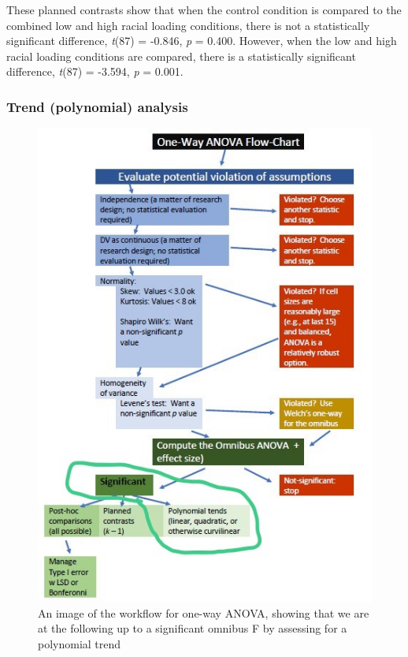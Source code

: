 \documentclass[
  english,
]{book}
\newenvironment{Shaded}{\begin{snugshade}}{\end{snugshade}}
\newcommand{\DecValTok}[1]{\textcolor[rgb]{0.00,0.00,0.81}{#1}}
\newcommand{\FunctionTok}[1]{\textcolor[rgb]{0.00,0.00,0.00}{#1}}
\newcommand{\NormalTok}[1]{#1}
\newcommand{\OtherTok}[1]{\textcolor[rgb]{0.56,0.35,0.01}{#1}}
\newcommand{\SpecialCharTok}[1]{\textcolor[rgb]{0.00,0.00,0.00}{#1}}
\begin{document}
\begin{Shaded}
\end{Shaded}

These planned contrasts show that when the control condition is compared to the combined low and high racial loading conditions, there is not a statistically significant difference, \emph{t}(87) = -0.846, \emph{p} = 0.400. However, when the low and high racial loading conditions are compared, there is a statistically significant difference, \emph{t}(87) = -3.594, \emph{p} = 0.001.

\hypertarget{trend-polynomial-analysis}{%
\subsubsection{Trend (polynomial) analysis}\label{trend-polynomial-analysis}}

\begin{figure}
\centering
\includegraphics{images/OnewayWrkFlw_poly.jpg}
\caption{An image of the workflow for one-way ANOVA, showing that we are at the following up to a significant omnibus F by assessing for a polynomial trend}
\end{figure}
\end{document}
